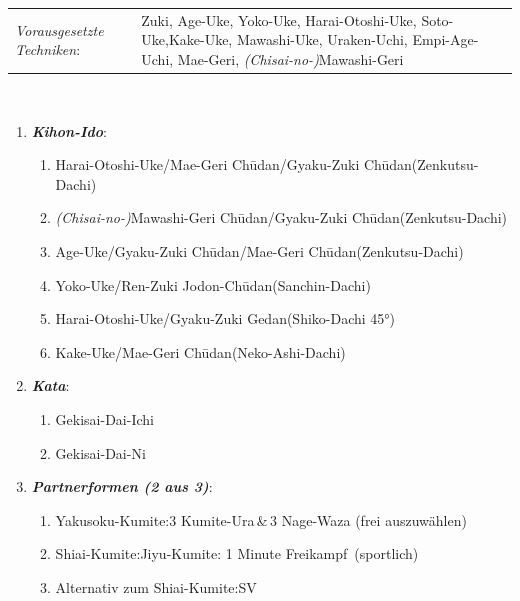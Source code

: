 \documentclass[a5paper,landscape,DIV=calc,11pt,notitlepage]{scrartcl}
\begin{document}
\begin{tcolorbox}[colback=white,colframe=GBELT,coltitle=white,title=6. Kyu: Grün]
	\renewcommand{\labelenumi}{\alph{enumi}.)}
	\renewcommand{\labelenumii}{\arabic*.}
	{\scriptsize
	\begin{tabularx}{\textwidth}{lX}
		\textit{Vorausgesetzte Techniken}:& Zuki, Age-Uke, Yoko-Uke, Harai-Otoshi-Uke, Soto-Uke,Kake-Uke, Mawashi-Uke, Uraken-Uchi, Empi-Age-Uchi, Mae-Geri, \textit{(Chisai-no-)}Mawashi-Geri
	\end{tabularx}\\}
	\begin{enumerate}[nosep]
		\item \textit{\textbf{Kihon-Ido}}:
		\begin{enumerate}[nosep]
			\item Harai-Otoshi-Uke/Mae-Geri Ch\={u}dan/Gyaku-Zuki Ch\={u}dan\tabto{280pt}(Zenkutsu-Dachi)
			\item \textit{(Chisai-no-)}Mawashi-Geri Ch\={u}dan/Gyaku-Zuki Ch\={u}dan\tabto{280pt}(Zenkutsu-Dachi)
			\item Age-Uke/Gyaku-Zuki Ch\={u}dan/Mae-Geri Ch\={u}dan\tabto{280pt}(Zenkutsu-Dachi)
			\item Yoko-Uke/Ren-Zuki Jodon-Ch\={u}dan\tabto{280pt}(Sanchin-Dachi)
			\item Harai-Otoshi-Uke/Gyaku-Zuki Gedan\tabto{280pt}(Shiko-Dachi 45°)
			\item Kake-Uke/Mae-Geri Ch\={u}dan\tabto{280pt}(Neko-Ashi-Dachi)
		\end{enumerate}
		\item \textit{\textbf{Kata}}:
		\begin{enumerate}[nosep]
			\item Gekisai-Dai-Ichi
			\item Gekisai-Dai-Ni
		\end{enumerate}
		\item \textit{\textbf{Partnerformen (2 aus 3)}}:
		\begin{enumerate}[nosep]
			\item Yakusoku-Kumite:\tabto{200pt}3 Kumite-Ura\,\&\,3 Nage-Waza (frei auszuwählen)
			\item Shiai-Kumite:\tabto{200pt}Jiyu-Kumite: 1 Minute \frqq Freikampf\flqq~(sportlich)
			\item Alternativ zum Shiai-Kumite:\tabto{200pt}SV
		\end{enumerate}
	\end{enumerate}
\end{tcolorbox}
\end{document}
